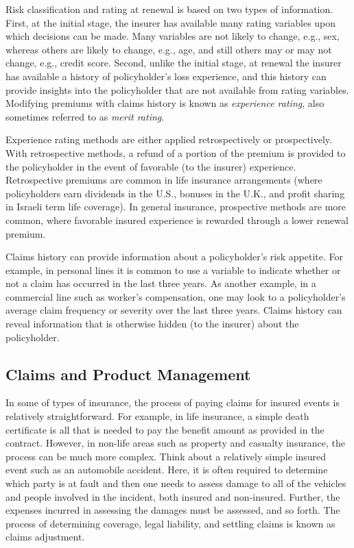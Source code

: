 \documentclass[
]{book}
\begin{document}
Risk classification and rating at renewal is based on two types of information. First, at the initial stage, the insurer has available many rating variables upon which decisions can be made. Many variables are not likely to change, e.g., sex, whereas others are likely to change, e.g., age, and still others may or may not change, e.g., credit score. Second, unlike the initial stage, at renewal the insurer has available a history of policyholder's loss experience, and this history can provide insights into the policyholder that are not available from rating variables. Modifying premiums with claims history is known as \emph{experience rating}, also sometimes referred to as \emph{merit rating}.

Experience rating methods are either applied retrospectively or prospectively. With retrospective methods, a refund of a portion of the
premium is provided to the policyholder in the event of favorable (to the insurer) experience. Retrospective premiums are common in life insurance arrangements (where policyholders earn dividends in the U.S., bonuses in the U.K., and profit sharing in Israeli term life coverage). In general insurance, prospective methods are more common, where favorable insured experience is rewarded through a lower renewal premium.

Claims history can provide information about a policyholder's risk appetite. For example, in personal lines it is common to use a variable to indicate whether or not a claim has occurred in the last three years. As another example, in a commercial line such as worker's compensation, one may look to a policyholder's average claim frequency or severity over the last three years. Claims history can reveal information that is otherwise hidden (to the insurer) about the policyholder.

\hypertarget{claims-and-product-management}{%
\subsection{Claims and Product Management}\label{claims-and-product-management}}

In some of types of insurance, the process of paying claims for insured events is relatively straightforward. For example, in life insurance, a simple death certificate is all that is needed to pay the benefit amount as provided in the contract. However, in non-life areas such as property and casualty insurance, the process can be much more complex. Think about a relatively simple insured event such as an automobile accident. Here, it is often required to determine which party is at fault and then one needs to assess damage to all of the vehicles and people involved in the incident, both insured and non-insured. Further, the expenses incurred in assessing the damages must be assessed, and so forth. The process of determining coverage, legal liability, and settling claims is known as claims adjustment.
\end{document}
